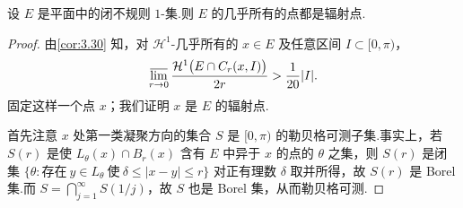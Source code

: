 \begin{lemma}\label{lem:6.11}
设 $E$ 是平面中的闭不规则 $1$-集.则 $E$ 的几乎所有的点都是辐射点.
\end{lemma}

\begin{proof}
由\cref{cor:3.30} 知，对 $\mathcal{H}^1$-几乎所有的 $x\in E$ 及任意区间 $I\subset[0,\pi)$，
\begin{equation}\label{eq:6.11}
  \varlimsup_{r\to 0}\frac{\mathcal{H}^{1}\bigl(E\cap C_r(x,I)\bigr)}{2r}>\frac{1}{20}|I|.
\end{equation}
固定这样一个点 $x$；我们证明 $x$ 是 $E$ 的辐射点.

首先注意 $x$ 处第一类凝聚方向的集合 $S$ 是 $[0,\pi)$ 的勒贝格可测子集.事实上，若 $S(r)$ 是使 $L_\theta(x)\cap B_r(x)$ 含有 $E$ 中异于 $x$ 的点的 $\theta$ 之集，则 $S(r)$ 是闭集 $\{\theta:\text{存在}\ y\in L_\theta\ \text{使}\ \delta\leq|x-y|\leq r\}$ 对正有理数 $\delta$ 取并所得，故 $S(r)$ 是 Borel 集.而 $S=\bigcap_{j=1}^{\infty}S(1/j)$，故 $S$ 也是 Borel 集，从而勒贝格可测.


\end{proof}
